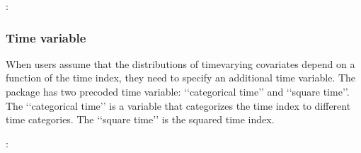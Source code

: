 \documentclass[letterpaper,10pt,english]{sphinxmanual}
\begin{document}
\begin{sphinxVerbatim}[commandchars=\\\{\}]
        
                  
               
               \PYG{p}{[} \PYG{p}{]}
               \PYG{p}{[} \PYG{p}{]}
               
\end{sphinxVerbatim}

\sphinxAtStartPar
{}:
\begin{quote}

\end{quote}


\subsubsection{Time variable}
\label{\detokenize{Specifications/Covariate models:time-variable}}
\sphinxAtStartPar
When users assume that the distributions of time\sphinxhyphen{}varying covariates
depend on a function of the time index, they need to specify an additional time variable. The package has two pre\sphinxhyphen{}coded
time variable: ‘‘categorical time’’ and ‘‘square time’’.
The ‘‘categorical time’’ is a variable that categorizes the time index to different time categories. The ‘‘square time’’
is the squared time index.

\sphinxAtStartPar
{}:
\end{document}

